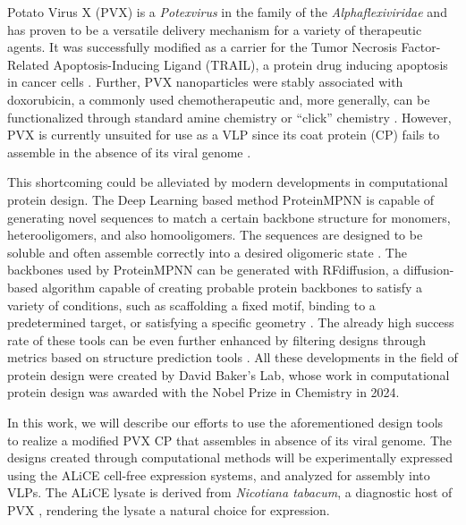 Potato Virus X (PVX) is a \emph{Potexvirus} in the family of the \emph{Alphaflexiviridae} and has proven to be a versatile delivery mechanism for a variety of therapeutic agents. It was successfully modified as a carrier for the Tumor Necrosis Factor-Related Apoptosis-Inducing Ligand (TRAIL), a protein drug inducing apoptosis in cancer cells \cite{pvx_trail}. Further, PVX nanoparticles were stably associated with doxorubicin, a commonly used chemotherapeutic \cite{pvx_doxorubicin} and, more generally, can be functionalized through standard amine chemistry or ``click'' chemistry \cite{pvx_chemical_modification}. However, PVX is currently unsuited for use as a VLP since its coat protein (CP) fails to assemble in the absence of its viral genome \cite{juli_sagt_keine_assembly}.

This shortcoming could be alleviated by modern developments in computational protein design. The Deep Learning based method ProteinMPNN is capable of generating novel sequences to match a certain backbone structure for monomers, heterooligomers, and also homooligomers. The sequences are designed to be soluble and often assemble correctly into a desired oligomeric state \cite{PMPNN2022}. The backbones used by ProteinMPNN can be generated with RFdiffusion, a diffusion-based algorithm capable of creating probable protein backbones to satisfy a variety of conditions, such as scaffolding a fixed motif, binding to a predetermined target, or satisfying a specific geometry \cite{RFdiffusion}. The already high success rate of these tools can be even further enhanced by filtering designs through metrics based on structure prediction tools \cite{physics_binder_design}. All these developments in the field of protein design were created by David Baker's Lab, whose work in computational protein design was awarded with the Nobel Prize in Chemistry in 2024. 

In this work, we will describe our efforts to use the aforementioned design tools to realize a modified PVX CP that assembles in absence of its viral genome. The designs created through computational methods will be experimentally expressed using the ALiCE\textsuperscript{\textregistered} cell-free expression systems, and analyzed for assembly into VLPs. The ALiCE\textsuperscript{\textregistered} lysate is derived from \emph{Nicotiana tabacum}, a diagnostic host of PVX \cite{pvx_host_tabacum}, rendering the lysate a natural choice for expression. 